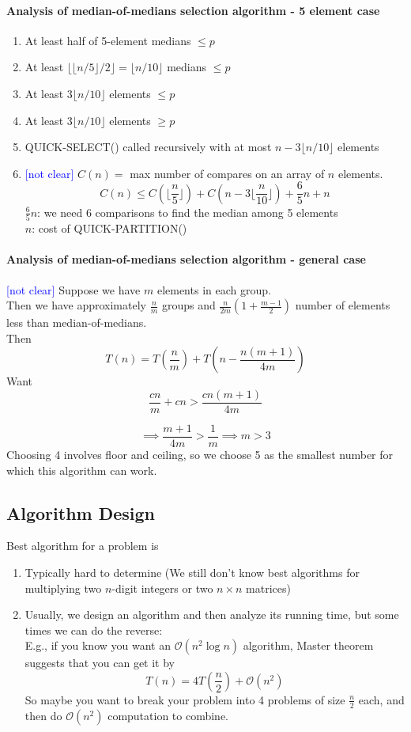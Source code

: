 \documentclass[11pt]{article}
\begin{document}
\paragraph{Analysis of median-of-medians selection algorithm - 5 element case}
\begin{enumerate}
	\item At least half of 5-element medians $\leq p$
	\item At least $\lfloor\lfloor n / 5 \rfloor / 2 \rfloor = \lfloor n / 10 \rfloor$ medians $\leq p$
	\item At least $3 \lfloor n / 10 \rfloor$ elements $\leq p$
	\item At least $3 \lfloor n / 10 \rfloor$ elements $\geq p$
	\item QUICK-SELECT() called recursively with at most $n - 3 \lfloor n / 10 \rfloor$ elements 
	\item \textcolor{blue}{[not clear]} $C(n) = $ max number of compares on an array of $n$ elements.
	$$C(n) \leq C(\lfloor \frac{n}{5} \rfloor) + C(n - 3\lfloor \frac{n}{10} \rfloor) + \frac{6}{5}n + n$$
	$\frac{6}{5}n$: we need 6 comparisons to find the median among 5 elements  \\
	$n$: cost of QUICK-PARTITION()
\end{enumerate}

\paragraph{Analysis of median-of-medians selection algorithm - general case}
\textcolor{blue}{[not clear]}
Suppose we have $m$ elements in each group. \\
Then we have approximately $\frac{n}{m}$ groups and $\frac{n}{2m}(1 + \frac{m-1}{2})$ number of elements less than median-of-medians. \\
Then $$T(n) = T(\frac{n}{m}) + T(n - \frac{n(m+1)}{4m}) $$
Want $$\frac{cn}{m} + cn > \frac{cn(m+1)}{4m}$$

$$\implies \frac{m+1}{4m} > \frac{1}{m} \implies m > 3$$
Choosing 4 involves floor and ceiling, so we choose 5 as the smallest number for which this algorithm can work.

\subsection{Algorithm Design}
Best algorithm for a problem is
\begin{enumerate}
	\item Typically hard to determine (We still don't know best algorithms for multiplying two $n$-digit integers or two $n \times n$ matrices)
	\item Usually, we design an algorithm and then analyze its running time, but some times we can do the reverse: \\
	E.g., if you know you want an $\mathcal{O}(n^2 \log n)$ algorithm, Master theorem suggests that you can get it by
	$$T(n) = 4T(\frac{n}{2}) + \mathcal{O}(n^2)$$
	So maybe you want to break your problem into 4 problems of size $\frac{n}{2}$ each, and then do $\mathcal{O}(n^2)$ computation to combine.
\end{enumerate}
\end{document}
